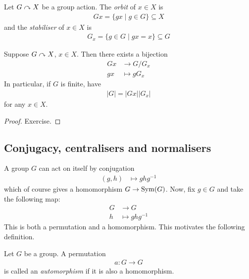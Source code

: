 \documentclass{../template/note}
\begin{document}
    \begin{definition}
        Let $G \curvearrowright X$ be a group action. The \emph{orbit} of $x \in X$ is
        \begin{align*}
            Gx = \{gx \mid g \in G\} \subseteq X
        \end{align*}
        and the \emph{stabiliser} of $x \in X$ is
        \begin{align*}
            G_x = \{g \in G \mid gx = x\} \subseteq G
        \end{align*}
    \end{definition}
    
    \begin{theorem}
        Suppose $G \curvearrowright X$, $x \in X$. Then there exists a bijection
        \begin{align*}
            Gx &\to G/G_x \\
            gx &\mapsto gG_x
        \end{align*}
        In particular, if $G$ is finite, have
        \begin{align*}
            |G| = |Gx||G_x|
        \end{align*}
        for any $x \in X$.       
    \end{theorem}
    
    \begin{proof}
        Exercise.
    \end{proof}
    
    \subsection{Conjugacy, centralisers and normalisers}

    A group $G$ can act on itself by conjugation
    \begin{align*}
        (g, h) &\mapsto ghg^{-1}
    \end{align*}
    which of course gives a homomorphism $G \to \operatorname{Sym}(G)$. Now, fix $g \in G$ and take the following map:
    \begin{align*}
        G &\to G \\
        h &\mapsto ghg^{-1}
    \end{align*}
    This is both a permutation and a homomorphism. This motivates the following definition.

    \begin{definition}[Automorphism]
        Let $G$ be a group. A permutation
        \begin{align*}
            a: G \to G
        \end{align*}
        is called an \emph{automorphism} if it is also a homomorphism.
    \end{definition}
    
\end{document}
